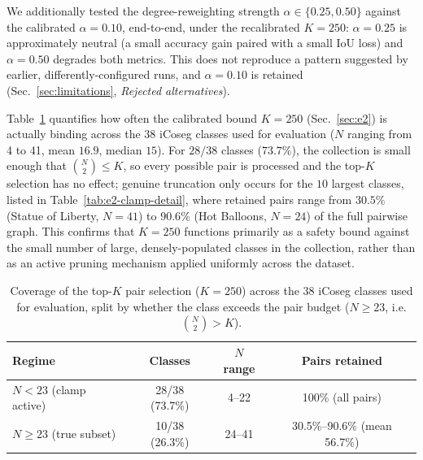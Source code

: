 We additionally tested the degree-reweighting strength $\alpha \in
\{0.25, 0.50\}$ against the calibrated $\alpha=0.10$, end-to-end, under
the recalibrated $K=250$: $\alpha=0.25$ is approximately neutral (a
small accuracy gain paired with a small IoU loss) and $\alpha=0.50$
degrades both metrics. This does not reproduce a pattern suggested by
earlier, differently-configured runs, and $\alpha=0.10$ is retained
(Sec.~\ref{sec:limitations}, \emph{Rejected alternatives}).

Table~\ref{tab:e2-clamp} quantifies how often the calibrated bound
$K=250$ (Sec.~\ref{sec:e2}) is actually binding across the 38 iCoseg
classes used for evaluation ($N$ ranging from 4 to 41, mean $16.9$,
median $15$). For $28/38$ classes ($73.7\%$), the collection is small
enough that $\binom{N}{2} \leq K$, so every possible pair is processed
and the top-$K$ selection has no effect; genuine truncation only
occurs for the $10$ largest classes, listed in
Table~\ref{tab:e2-clamp-detail}, where retained pairs range from
$30.5\%$ (Statue of Liberty, $N=41$) to $90.6\%$ (Hot Balloons,
$N=24$) of the full pairwise graph. This confirms that $K=250$
functions primarily as a safety bound against the small number of
large, densely-populated classes in the collection, rather than as an
active pruning mechanism applied uniformly across the dataset.

\begin{table}[t]
\centering
\caption{Coverage of the top-$K$ pair selection ($K=250$) across the
38 iCoseg classes used for evaluation, split by whether the class
exceeds the pair budget ($N \geq 23$, i.e. $\binom{N}{2} > K$).}
\label{tab:e2-clamp}
\begin{tabular}{@{}lccc@{}}
\toprule
\textbf{Regime} & \textbf{Classes} & \textbf{$N$ range} & \textbf{Pairs retained} \\
\midrule
$N < 23$ (clamp active)   & 28/38 (73.7\%) & 4--22  & 100\% (all pairs) \\
$N \geq 23$ (true subset) & 10/38 (26.3\%) & 24--41 & 30.5\%--90.6\% (mean 56.7\%) \\
\bottomrule
\end{tabular}
\end{table}

